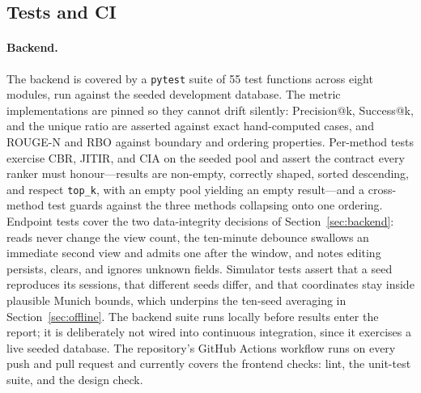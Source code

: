\documentclass[acmlarge]{acmart}
\begin{document}
\subsection{Tests and CI}
\label{sec:tests}

\paragraph{Backend.}
The backend is covered by a \texttt{pytest} suite of 55 test functions
across eight modules, run against the seeded development database. The
metric implementations are pinned so they cannot drift silently:
Precision@k, Success@k, and the unique ratio are asserted against exact
hand-computed cases, and ROUGE-N and RBO against boundary and ordering
properties. Per-method tests exercise CBR, JITIR, and CIA on the seeded
pool and assert the contract every ranker must honour---results are
non-empty, correctly shaped, sorted descending, and respect
\texttt{top\_k}, with an empty pool yielding an empty result---and a
cross-method test guards against the three methods collapsing onto one
ordering. Endpoint tests cover the two data-integrity decisions of
Section~\ref{sec:backend}: reads never change the view count, the
ten-minute debounce swallows an immediate second view and admits one
after the window, and notes editing persists, clears, and ignores unknown
fields. Simulator tests assert that a seed reproduces its sessions, that
different seeds differ, and that coordinates stay inside plausible Munich
bounds, which underpins the ten-seed averaging in
Section~\ref{sec:offline}. The backend suite runs locally before results
enter the report; it is deliberately not wired into continuous
integration, since it exercises a live seeded database. The repository's
GitHub Actions workflow runs on every push and pull request and currently
covers the frontend checks: lint, the unit-test suite, and the design
check.
\end{document}
